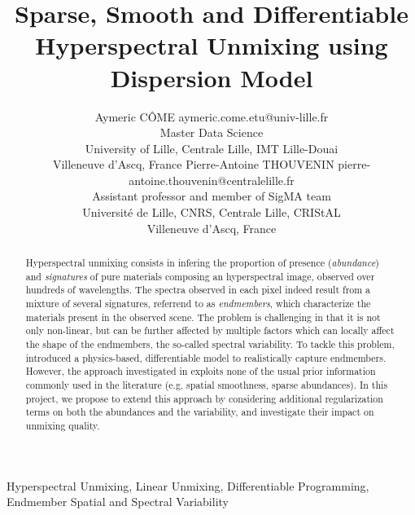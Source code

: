 \documentclass{article}
\begin{document}
\title{Sparse, Smooth and Differentiable Hyperspectral Unmixing using Dispersion Model}

\author{\name Aymeric CÔME \email aymeric.come.etu@univ-lille.fr \\
       \addr Master Data Science\\
       University of Lille, Centrale Lille, IMT Lille-Douai\\
       Villeneuve d'Ascq, France
       \AND
       \name Pierre-Antoine THOUVENIN \email pierre-antoine.thouvenin@centralelille.fr \\
       \addr Assistant professor and member of SigMA team\\
       Université de Lille, CNRS, Centrale Lille, CRIStAL\\
       Villeneuve d'Ascq, France}

\maketitle

\begin{abstract}%
  Hyperspectral unmixing consists in infering the proportion of presence (\emph{abundance}) and \emph{signatures} of pure materials composing an hyperspectral image, observed over hundreds of wavelengths. The spectra observed in each pixel indeed result from a mixture of several signatures, referrend to as \emph{endmembers}, which characterize the materials present in the observed scene. The problem is challenging in that it is not only non-linear, but can be further affected by multiple factors which can locally affect the shape of the endmembers, the so-called spectral variability. To tackle this problem, \citet{janiczek_differentiable_2020} introduced a physics-based, differentiable model to realistically capture endmembers. However, the approach investigated in \citet{janiczek_differentiable_2020} exploits none of the usual prior information commonly used in the literature (e.g. spatial smoothness, sparse abundances). In this project, we propose to extend this approach by considering additional regularization terms on both the abundances and the variability, and investigate their impact on unmixing quality.
\end{abstract}

\begin{keywords}
Hyperspectral Unmixing, Linear Unmixing, Differentiable Programming, Endmember Spatial and Spectral Variability
\end{keywords}
\end{document}
